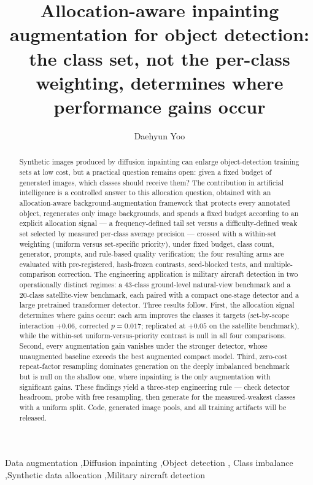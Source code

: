 \documentclass[preprint,12pt,authoryear]{elsarticle}
\begin{document}
\begin{frontmatter}

\title{Allocation-aware inpainting augmentation for object detection:
the class set, not the per-class weighting, determines where
performance gains occur}

\author[a]{Daehyun Yoo}

\begin{abstract}
Synthetic images produced by diffusion inpainting can enlarge
object-detection training sets at low cost, but a practical question
remains open: given a fixed budget of generated images, which classes
should receive them? The contribution in artificial intelligence is a
controlled answer to this allocation question, obtained with an
allocation-aware background-augmentation framework that protects every
annotated object, regenerates only image backgrounds, and spends a
fixed budget according to an explicit allocation signal --- a frequency-defined tail set versus
a difficulty-defined weak set selected by measured per-class average
precision --- crossed with a within-set weighting (uniform versus
set-specific priority), under fixed budget, class count, generator,
prompts, and rule-based quality verification; the four resulting arms are
evaluated with pre-registered, hash-frozen contrasts, seed-blocked
tests, and multiple-comparison correction. The engineering application
is military aircraft detection in two operationally distinct regimes: a
43-class ground-level natural-view benchmark and a 20-class
satellite-view benchmark, each paired with a compact one-stage detector
and a large pretrained transformer detector. Three results follow.
First, the allocation signal determines where gains occur: each arm
improves the classes it targets (set-by-scope interaction $+0.06$,
corrected $p = 0.017$; replicated at $+0.05$ on the satellite
benchmark), while the within-set uniform-versus-priority contrast is null
in all four comparisons.
Second, every augmentation gain vanishes under the stronger detector,
whose unaugmented baseline exceeds the best augmented compact model.
Third, zero-cost repeat-factor resampling dominates generation on the
deeply imbalanced benchmark but is null on the shallow one, where
inpainting is the only augmentation with significant gains. These
findings yield a three-step engineering rule --- check detector
headroom, probe with free resampling, then generate for the
measured-weakest classes with a uniform split. Code, generated image
pools, and all training artifacts will be released.
\end{abstract}

\begin{keyword}
Data augmentation \sep Diffusion inpainting \sep Object detection \sep
Class imbalance \sep Synthetic data allocation \sep Military aircraft
detection
\end{keyword}

\end{frontmatter}
\end{document}
